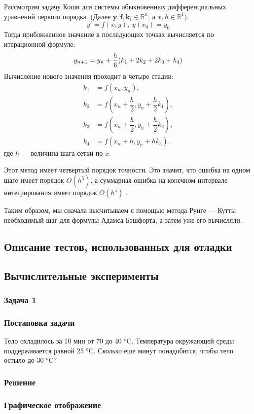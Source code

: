 \documentclass[a4paper,fleqn,14pt,titlepage]{extarticle}
\begin{document}
	Рассмотрим задачу Коши для системы обыкновенных дифференциальных уравнений первого порядка. (Далее ${\mathbf{y},\mathbf{f},\mathbf{k}_{i}\in\mathbb{R}^{n}}$, а ${x,h\in\mathbb{R}^{1}}).$
	$$y'=f(x,y),\;y(x_0)=y_0$$
	Тогда приближенное значение в последующих точках вычисляется по итерационной формуле:
	$$y_{n+1} = y_n + {h \over 6}(k_1 + 2k_2 + 2k_3 + k_4)$$
	Вычисление нового значения проходит в четыре стадии:
	\begin{align}
		k_1&=f(x_n,y_n),\\
		k_2&=f(x_n+\dfrac{h}{2},y_n+\dfrac{h}{2}k_1),\\
		k_3&=f(x_n+\dfrac{h}{2},y_n+\dfrac{h}{2}k_2),\\
		k_4&=f(x_n+h,y_n+hk_3).
	\end{align}
	где $h$ --- величина шага сетки по $x$.
	
	Этот метод имеет четвертый порядок точности. Это значит, что ошибка на одном шаге имеет порядок $O(h^5)$, а суммарная ошибка на конечном интервале интегрирования имеет порядок $O(h^4)$ .
	
	Таким образом, мы сначала высчитываем с помощью метода Рунге — Кутты необходимый шаг для формулы Адамса-Бэшфорта, а затем уже его вычисляли.
	\subsection{Описание тестов, использованных для отладки}
	\subsection{Вычислительные эксперименты}
		\subsubsection{Задача 1}
			\subsubsection*{Постановка задачи}
				Тело охладилось за 10 мин от 70 до 40 °C. Температура окружающей среды поддерживается равной 25 °C. Сколько еще минут понадобится, чтобы тело остыло до 30 °C?
			\subsubsection*{Решение}
			 
			\subsubsection*{Графическое отображение}
\end{document}
